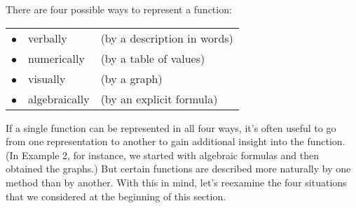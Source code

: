 \documentclass{sebase}
\begin{document}
There are four possible ways to represent a function:\medskip

\begin{tabular}{ll}
$\bullet \quad $verbally & (by a description in words) \\ 
$\bullet \quad $numerically & (by a table of values) \\ 
$\bullet \quad $visually & (by a graph) \\ 
$\bullet \quad $algebraically & (by an explicit formula)%
\end{tabular}%
\medskip

If a single function can be represented in all four ways, it's often useful
to go from one representation to another to gain additional insight into the
function. (In Example 2, for instance, we started with algebraic formulas
and then obtained the graphs.) But certain functions are described more
naturally by one method than by another. With this in mind, let's reexamine
the four situations that we considered at the beginning of this section.
\end{document}
